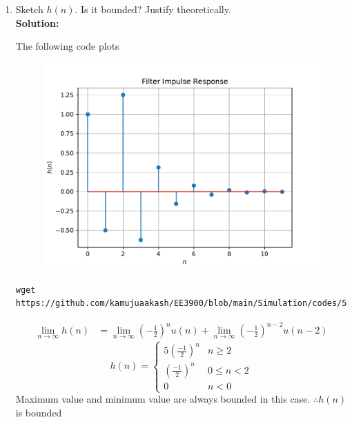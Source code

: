 \documentclass[journal,12pt,twocolumn]{IEEEtran}
\newcommand{\solution}{\noindent \textbf{Solution: }}
\providecommand{\brak}[1]{\ensuremath{\left(#1\right)}}
\numberwithin{equation}{section}
\renewcommand\thesection{\arabic{section}}
\begin{document}
\begin{enumerate}[label=\thesection.\arabic*]
\item Sketch $h(n)$. Is it bounded? Justify theoretically.
\\
\solution 

The following code plots
\begin{figure}[!ht]
\begin{center}
\includegraphics[width=\columnwidth]{./figs/hn}
\end{center}
\label{fig:xnyn}	
\end{figure}
\begin{lstlisting}
wget https://github.com/kamujuaakash/EE3900/blob/main/Simulation/codes/5.3.py
\end{lstlisting}

\begin{align}
\lim_{n\to\infty}h(n)&=\lim_{n\to\infty}\brak{-\frac{1}{2}}^{n}u(n) + \lim_{n\to\infty}\brak{-\frac{1}{2}}^{n-2}u(n-2)
\end{align}
\begin{equation}
h(n)
=
\begin{cases}
5\brak{\frac{-1}{2}}^n & n \ge 2
\\
\brak{\frac{-1}{2}}^n & 0\le n < 2
\\
0 & n<0
\end{cases}
\end{equation}
Maximum value and minimum value are always bounded in this case.
$\therefore h(n)$ is bounded


\end{enumerate}
\end{document}
